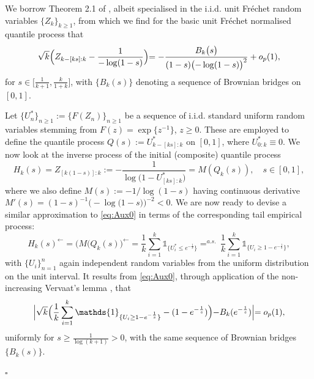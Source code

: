 \documentclass[11pt, a4paper, oneside]{article}
\numberwithin{equation}{section}
\theoremstyle{plain}
\theoremstyle{definition}
\newenvironment{pfofLem}{\noindent{\bf Proof of Lemma}}{\hfill $\square$ \\}
\newcommand{\as}{\ensuremath{\displaystyle{\mathop {=} ^{a.s.}}}}
\newcommand{\one}{\mathds{1}}
\begin{document}
\begin{pfofLem}{~\ref{Lem:BasicEmpProcess}:}
We borrow Theorem 2.1 of \cite{FerreiradeHaan2015}, albeit specialised in the i.i.d. unit Fr\'echet random variables $\{Z_k\}_{k\geq 1}$, from which we find for the basic unit Fr\'echet normalised quantile process that
    \begin{equation}\label{eq:Aux0}
        \sqrt{k}\Bigr(Z_{k-[ks]:k}-\frac{1}{-\log(1-s)}\Bigl)= -\frac{B_{k}\bigl(s\bigl)}{(1-s)\bigl(-\log(1-s)\bigl)^{2}}+o_{p}(1),
    \end{equation}
    for $s\in \bigl[\frac{1}{k+1},\frac{k}{1+k}\bigl]$, with $\{B_k(s)\}$ denoting a sequence of Brownian bridges on $[0,1]$.
    
\noindent Let $\bigl\{U^{*}_{n}\bigl\}_{n\geq 1}:=\bigl\{F(Z_{n})\bigl\}_{n\geq 1}$ be a sequence of i.i.d. standard uniform random variables stemming from $F(z) = \exp\{ z^{-1}\}$, $z\geq 0$. These are employed to define the quantile process $Q(s):=U^{*}_{k-[ks]:k}$ on $[0,1]$, where $U^{*}_{0:k } \equiv 0$. We now look at the inverse process of the initial (composite) quantile process
 \begin{equation*}
    H_{k}(s) = Z_{[k(1-s)]:k}:=-\frac{1}{\log \bigl( 1- U^{*}_{[ks]:k}\bigr)}= M(Q_{k}(s)), \quad s\in[0,1],
\end{equation*}
where we also define $M(s) := -1/\log (1-s)$ having continuous derivative $
    M'(s)=(1-s)^{-1}\bigl(-\log\bigl(1-s\bigl)\bigl)^{-2} <0$.
We are now ready to devise a similar approximation to \eqref{eq:Aux0} in terms of the  corresponding tail empirical process:
\begin{equation*}
  H_{k}(s)^{\leftarrow}= \bigl(M(Q_k(s)\bigl)^{\leftarrow}= \frac{1}{k}\displaystyle\sum_{i=1} ^{k}\one_{\{U_{i}^{*}\leq e^{-\frac{1}{s}}\}} \as \,\frac{1}{k}\displaystyle\sum_{i=1} ^{k}\one_{\{U_{i}\geq 1-e^{-\frac{1}{s}}\}},
\end{equation*}
with $\bigl\{U_{i}\bigl\}_{n=1}^{n}$ again independent random variables from the uniform distribution on the unit interval.
It results from \eqref{eq:Aux0}, through application of the non-increasing Vervaat's lemma \citep[cf.][Proposition 3]{Resnick2007}, that
\begin{equation}\label{eq:Aux1}
    \Bigl|\sqrt{k}\Bigl(\frac{1}{k}\displaystyle\sum_{i=1} ^{k}\one_{\{U_{i}\geq 1-e^{-\frac{1}{s}}\}}-(1-e^{-\frac{1}{s}}) \Bigl)-B_{k}(e^{-\frac{1}{s}})\Bigl|=o_{p}(1),
\end{equation}
uniformly for $s \geq \frac{1}{\log (k+1)} >0$, with the same sequence of Brownian bridges $\{B_k(s)\}$.


\end{pfofLem}
\end{document}
